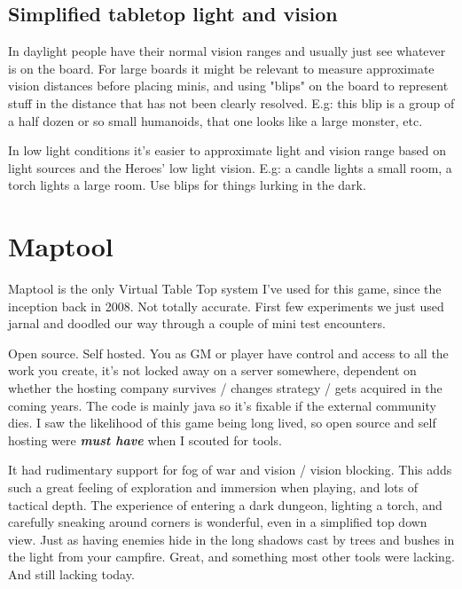 \subsection*{Simplified tabletop light and vision}
In daylight people have their normal vision ranges and usually just see whatever is on the board. For large boards it might be relevant to measure approximate vision distances before placing minis, and using "blips" on the board to represent stuff in the distance that has not been clearly resolved. E.g: this blip is a group of a half dozen or so small humanoids, that one looks like a large monster, etc.

In low light conditions it's easier to approximate light and vision range based on light sources and the Heroes' low light vision. E.g: a candle lights a small room, a torch lights a large room. Use blips for things lurking in the dark.







\section*{Maptool}
Maptool is the only Virtual Table Top system I've used for this game, since the inception back in 2008. Not totally accurate. First few experiments we just used jarnal and doodled our way through a couple of mini test encounters.

Open source. Self hosted. You as GM or player have control and access to all the work you create, it's not locked away on a server somewhere, dependent on whether the hosting company survives / changes strategy / gets acquired in the coming years. The code is mainly java so it's fixable if the external community dies. I saw the likelihood of this game being long lived, so open source and self hosting were \textit{\textbf{must have}} when I scouted for tools.

It had rudimentary support for fog of war and vision / vision blocking. This adds such a great feeling of exploration and immersion when playing, and lots of tactical depth. The experience of entering a dark dungeon, lighting a torch, and carefully sneaking around corners is wonderful, even in a simplified top down view. Just as having enemies hide in the long shadows cast by trees and bushes in the light from your campfire. Great, and something most other tools were lacking. And still lacking today.

